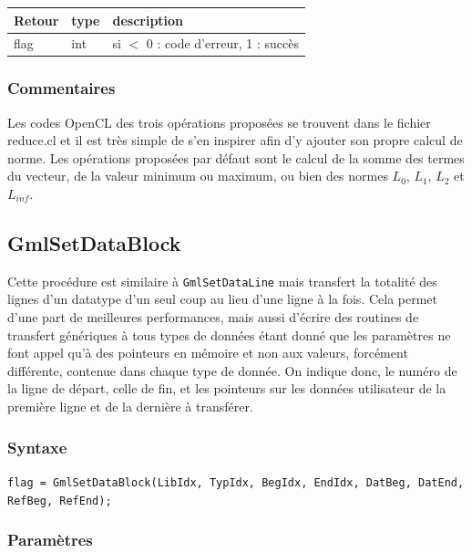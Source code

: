 \documentclass[a4paper,12pt]{article}
\begin{document}
\medskip

\begin{tabular}{|m{2cm}|m{1.5cm}|m{10.5cm}|}
\hline
Retour     & type   & description \\
\hline
flag       & int    & si $<$ 0 : code d'erreur, 1 : succès  \\
\hline
\end{tabular}

\subsubsection*{Commentaires}
Les codes OpenCL des trois opérations proposées se trouvent dans le fichier reduce.cl et il est très simple de s'en inspirer afin d'y ajouter son propre calcul de norme.
Les opérations proposées par défaut sont le calcul de la somme des termes du vecteur, de la valeur minimum ou maximum, ou bien des normes $L_0$, $L_1$, $L_2$ et $L_{inf}$.


\subsection{GmlSetDataBlock}

Cette procédure est similaire à {\tt GmlSetDataLine} mais transfert la totalité des lignes d'un datatype d'un seul coup au lieu d'une ligne à la fois. Cela permet d'une part de meilleures performances, mais aussi d'écrire des routines de transfert génériques à tous types de données étant donné que les paramètres ne font appel qu'à des pointeurs en mémoire et non aux valeurs, forcément différente, contenue dans chaque type de donnée.
On indique donc, le numéro de la ligne de départ, celle de fin, et les pointeurs sur les données utilisateur de la première ligne et de la dernière à transférer.

\subsubsection*{Syntaxe}

{\tt flag = GmlSetDataBlock(LibIdx, TypIdx, BegIdx, EndIdx, DatBeg, DatEnd, RefBeg, RefEnd);}

\subsubsection*{Paramètres}
\end{document}
